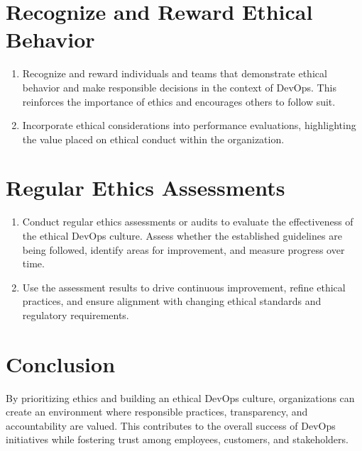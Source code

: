 \section*{Recognize and Reward Ethical Behavior}
        \begin{enumerate}
            \item Recognize and reward individuals and teams that demonstrate ethical behavior and make responsible decisions in the context of DevOps. This reinforces the importance of ethics and encourages others to follow suit.
    
            \item Incorporate ethical considerations into performance evaluations, highlighting the value placed on ethical conduct within the organization.
        \end{enumerate}

\section*{Regular Ethics Assessments}
        \begin{enumerate}
            \item Conduct regular ethics assessments or audits to evaluate the effectiveness of the ethical DevOps culture. Assess whether the established guidelines are being followed, identify areas for improvement, and measure progress over time.
    
            \item Use the assessment results to drive continuous improvement, refine ethical practices, and ensure alignment with changing ethical standards and regulatory requirements.
        \end{enumerate}


\section*{Conclusion}

By prioritizing ethics and building an ethical DevOps culture, organizations can create an environment where responsible practices, transparency, and accountability are valued. This contributes to the overall success of DevOps initiatives while fostering trust among employees, customers, and stakeholders.